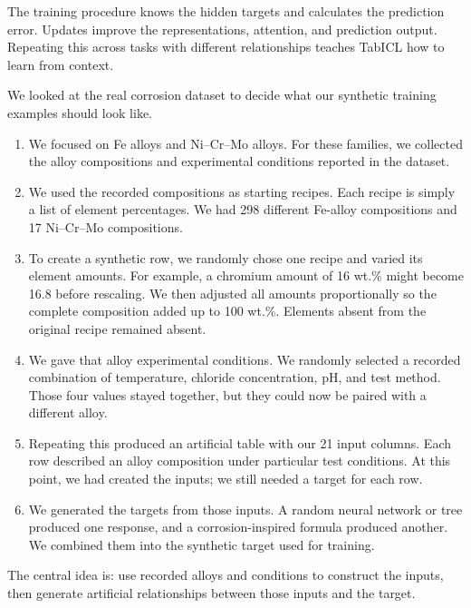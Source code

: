 \documentclass[11pt]{article}
\newenvironment{steps}
  {\begin{enumerate}\setlength{\itemsep}{0.45em}\setlength{\parsep}{0pt}}
  {\end{enumerate}}
\begin{document}
The training procedure knows the hidden targets and calculates the prediction error. Updates
improve the representations, attention, and prediction output. Repeating this across tasks
with different relationships teaches TabICL how to learn from context.

We looked at the real corrosion dataset to decide what our synthetic training examples
should look like.

\begin{steps}

    \item[1.] We focused on Fe alloys and Ni–Cr–Mo alloys. For these families, we collected
    the alloy compositions and experimental conditions reported in the dataset.

    \item[2.] We used the recorded compositions as starting recipes. Each recipe is simply a
    list of element percentages. We had 298 different Fe-alloy compositions and 17 Ni–Cr–Mo
    compositions.

    \item[3.] To create a synthetic row, we randomly chose one recipe and varied its element
    amounts. For example, a chromium amount of 16 wt.\% might become 16.8 before rescaling.
    We then adjusted all amounts proportionally so the complete composition added up to 100
    wt.\%. Elements absent from the original recipe remained absent.

    \item[4.] We gave that alloy experimental conditions. We randomly selected a recorded
    combination of temperature, chloride concentration, pH, and test method. Those four
    values stayed together, but they could now be paired with a different alloy.

    \item[5.] Repeating this produced an artificial table with our 21 input columns. Each
    row described an alloy composition under particular test conditions. At this point, we
    had created the inputs; we still needed a target for each row.

    \item[6.] We generated the targets from those inputs. A random neural network or tree
    produced one response, and a corrosion-inspired formula produced another. We combined
    them into the synthetic target used for training.

\end{steps}

The central idea is: use recorded alloys and conditions to construct the inputs, then
generate artificial relationships between those inputs and the target.
\end{document}
